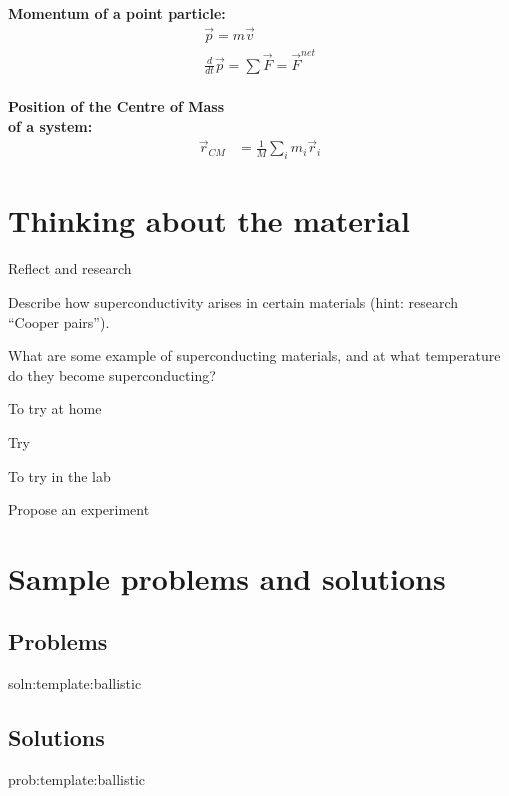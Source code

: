 \newpage
\begin{importantEquations}
\medskip
\begin{multicols}{2}
\textbf{Momentum of a point particle:}
\begin{align*}
\vec p = m\vec v \\
\frac{d}{dt}\vec p = \sum \vec F = \vec F^{net}
\end{align*}
\columnbreak
\\
\textbf{Position of the Centre of Mass \\ of a system:}
\begin{align*}
\vec r_{CM} &=\frac{1}{M}\sum_i m_i\vec r_i 
\end{align*}
\medskip
\end{multicols}
\end{importantEquations}

\newpage
\section{Thinking about the material}

\begin{chapteractivity}{Reflect and research}
{
\item Describe how superconductivity arises in certain materials (hint: research ``Cooper pairs'').
\item What are some example of superconducting materials, and at what temperature do they become superconducting?
}
\end{chapteractivity}

\begin{chapteractivity}{To try at home}
{
\item Try
}
\end{chapteractivity}

\begin{chapteractivity}{To try in the lab}
{
\item Propose an experiment
}
\end{chapteractivity}

\newpage
\section{Sample problems and solutions}
\subsection{Problems}
\begin{problem}{soln:template:ballistic}{\label{prob:template:ballistic} 

}
\end{problem}

\newpage
\subsection{Solutions}
\begin{solution}{prob:template:ballistic}\label{soln:template:ballistic}

\end{solution}

